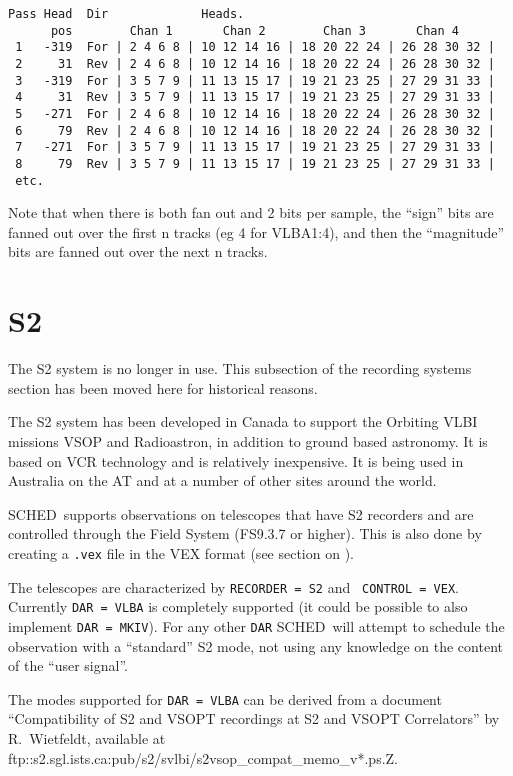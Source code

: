 \documentclass{report}
\newcommand{\schedb}{{\sc SCHED~}}
\begin{document}
\begin{verbatim}
Pass Head  Dir             Heads.
      pos        Chan 1       Chan 2        Chan 3       Chan 4
 1   -319  For | 2 4 6 8 | 10 12 14 16 | 18 20 22 24 | 26 28 30 32 |
 2     31  Rev | 2 4 6 8 | 10 12 14 16 | 18 20 22 24 | 26 28 30 32 |
 3   -319  For | 3 5 7 9 | 11 13 15 17 | 19 21 23 25 | 27 29 31 33 |
 4     31  Rev | 3 5 7 9 | 11 13 15 17 | 19 21 23 25 | 27 29 31 33 |
 5   -271  For | 2 4 6 8 | 10 12 14 16 | 18 20 22 24 | 26 28 30 32 |
 6     79  Rev | 2 4 6 8 | 10 12 14 16 | 18 20 22 24 | 26 28 30 32 |
 7   -271  For | 3 5 7 9 | 11 13 15 17 | 19 21 23 25 | 27 29 31 33 |
 8     79  Rev | 3 5 7 9 | 11 13 15 17 | 19 21 23 25 | 27 29 31 33 |
 etc.
\end{verbatim}

Note that when there is both fan out and 2 bits per sample, the ``sign''
bits are fanned out over the first n tracks (eg 4 for VLBA1:4),
and then the ``magnitude'' bits are fanned out over the next n tracks.



\section{\label{SSEC:S2}S2}

The S2 system is no longer in use.  This subsection of the recording
systems section has been moved here for historical reasons.

The S2 system has been developed in Canada to support
the Orbiting VLBI missions VSOP and Radioastron, in addition to ground
based astronomy.  It is based on VCR technology and is relatively
inexpensive.  It is being used in Australia on the AT and at a number
of other sites around the world.

\schedb supports observations on telescopes that have S2
recorders and are controlled through the Field System (FS9.3.7 or
higher). This is also done by creating a {\tt *.vex} file in the VEX
format (see section on ).

The telescopes are characterized by {\tt RECORDER = S2} and {\tt
  CONTROL = VEX}. Currently {\tt DAR = VLBA} is completely supported
(it could be possible to also implement {\tt DAR = MKIV}). For any
other {\tt DAR} \schedb will attempt to schedule the observation with
a ``standard'' S2 mode, not using any knowledge on the content of the
``user signal''.

The modes supported for {\tt DAR = VLBA} can be derived from a
document ``Compatibility of S2 and VSOPT recordings at S2 and VSOPT
Correlators'' by R.\ Wietfeldt, available at
ftp::s2.sgl.ists.ca:pub/s2/svlbi/s2vsop\_compat\_memo\_v*.ps.Z.
\end{document}
